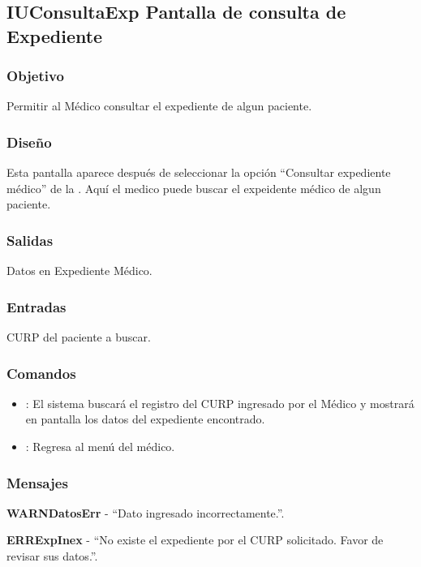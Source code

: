 \subsection{IUConsultaExp Pantalla de consulta de Expediente}

\subsubsection{Objetivo}
	Permitir al M\'edico consultar el expediente de algun paciente.

\subsubsection{Diseño}
	Esta pantalla aparece despu\'es de seleccionar la opci\'on "`Consultar expediente m\'edico"' de la \label{IUMedico}. Aqu\'i el medico puede buscar el expeidente m\'edico de algun paciente.


\subsubsection{Salidas}

	Datos en Expediente M\'edico.

\subsubsection{Entradas}
CURP del paciente a buscar.

\subsubsection{Comandos}
\begin{itemize}
		\item {}: El sistema buscar\'a el registro del CURP ingresado por el M\'edico y mostrar\'a en pantalla los datos del expediente encontrado.
		\item {}: Regresa al men\'u del m\'edico.
\end{itemize}

\subsubsection{Mensajes}
	\begin{Citemize}
		\item {\bf WARNDatosErr} - "`Dato ingresado incorrectamente."'.
		\item {\bf ERRExpInex} - "`No existe el expediente por el CURP solicitado. Favor de revisar sus datos."'.
	\end{Citemize}